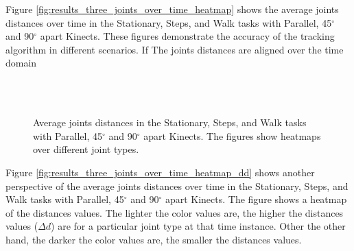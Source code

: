 Figure \ref{fig:results_three_joints_over_time_heatmap} shows the average joints distances over time in the Stationary, Steps, and Walk tasks with Parallel, 45$^{\circ}$ and 90$^{\circ}$ apart Kinects. These figures demonstrate the accuracy of the tracking algorithm in different scenarios. If The joints distances are aligned over the time domain


\begin{figure*}[!htb]
  \centering

  \subfloat[Stationary]{
     
    
    
  } \\
  \subfloat[Steps]{
     
    
    
  } \\
  \subfloat[Walk]{
     
    
    
  }

  \caption{Average joints distances in the Stationary, Steps, and Walk tasks with Parallel, 45$^{\circ}$ and 90$^{\circ}$ apart Kinects. The figures show heatmaps over different joint types.}

  \label{fig:results_three_joints_over_time}
\end{figure*}

Figure \ref{fig:results_three_joints_over_time_heatmap_dd} shows another perspective of the average joints distances over time in the Stationary, Steps, and Walk tasks with Parallel, 45$^{\circ}$ and 90$^{\circ}$ apart Kinects. The figure shows a heatmap of the distances values. The lighter the color values are, the higher the distances values ($\Delta d$) are for a particular joint type at that time instance. Other the other hand, the darker the color values are,
the smaller the distances values.

